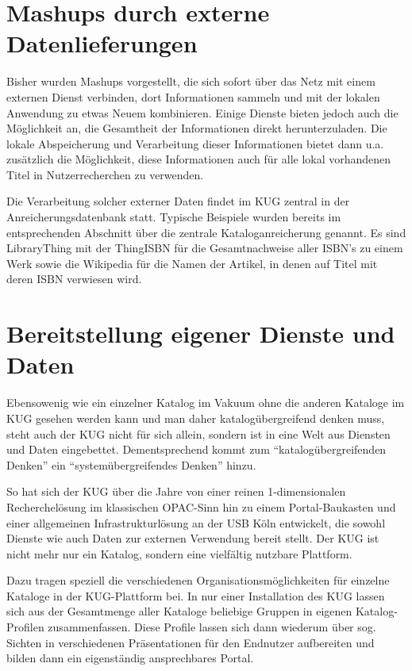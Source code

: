 \documentclass[11pt]{scrartcl}
\begin{document}
\section{Mashups durch externe Datenlieferungen}

Bisher wurden Mashups vorgestellt, die sich sofort über das Netz mit
einem externen Dienst verbinden, dort Informationen sammeln und mit
der lokalen Anwendung zu etwas Neuem kombinieren. Einige Dienste
bieten jedoch auch die Möglichkeit an, die Gesamtheit der
Informationen direkt herunterzuladen. Die lokale Abspeicherung und
Verarbeitung dieser Informationen bietet dann u.a. zusätzlich die
Möglichkeit, diese Informationen auch für alle lokal vorhandenen Titel
in Nutzerrecherchen zu verwenden.

Die Verarbeitung solcher externer Daten findet im KUG zentral in der
Anreicherungsdatenbank statt. Typische Beispiele wurden bereits im
entsprechenden Abschnitt über die zentrale Kataloganreicherung
genannt. Es sind LibraryThing mit der ThingISBN für die
Gesamtnachweise aller ISBN’s zu einem Werk sowie die Wikipedia für die
Namen der Artikel, in denen auf Titel mit deren ISBN verwiesen wird.

\section{Bereitstellung eigener Dienste und Daten}

Ebensowenig wie ein einzelner Katalog im Vakuum ohne die anderen
Kataloge im KUG gesehen werden kann und man daher katalogübergreifend
denken muss, steht auch der KUG nicht für sich allein, sondern ist in
eine Welt aus Diensten und Daten eingebettet. Dementsprechend kommt
zum "`katalogübergreifenden Denken"' ein "`systemübergreifendes
Denken"' hinzu.

So hat sich der KUG über die Jahre von einer reinen 1-dimensionalen
Recherchelösung im klassischen OPAC-Sinn hin zu einem Portal-Baukasten
und einer allgemeinen Infrastrukturlösung an der USB Köln entwickelt,
die sowohl Dienste wie auch Daten zur externen Verwendung bereit
stellt. Der KUG ist nicht mehr nur ein Katalog, sondern eine
vielfältig nutzbare Plattform.

Dazu tragen speziell die verschiedenen Organisationsmöglichkeiten für
einzelne Kataloge in der KUG-Plattform bei. In nur einer Installation
des KUG lassen sich aus der Gesamtmenge aller Kataloge beliebige
Gruppen in eigenen Katalog-Profilen zusammenfassen. Diese Profile
lassen sich dann wiederum über sog. Sichten in verschiedenen
Präsentationen für den Endnutzer aufbereiten und bilden dann ein
eigenständig ansprechbares Portal.
\end{document}
